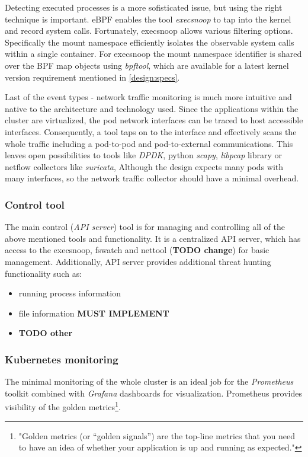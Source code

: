 Detecting executed processes is a more sofisticated issue, but using the right technique is important. eBPF enables the tool \textit{execsnoop} to tap into the kernel and record system calls. Fortunately, execsnoop allows various filtering options. Specifically the mount namespace efficiently isolates the observable system calls within a single container. For execsnoop the mount namespace identifier is shared over the BPF map objects using \textit{bpftool}, which are available for a latest kernel version requirement mentioned in \autoref{design:specs}.

Last of the event types - network traffic monitoring is much more intuitive and native to the architecture and technology used. Since the applications within the cluster are virtualized, the pod network interfaces can be traced to host accessible interfaces. Consequently, a tool taps on to the interface and effectively scans the whole traffic including a pod-to-pod and pod-to-external communications. This leaves open possibilities to tools like \textit{DPDK}, python \textit{scapy}, \textit{libpcap} library or netflow collectors like \textit{suricata}, Although the design expects many pods with many interfaces, so the network traffic collector should have a minimal overhead. %

\subsubsection*{Control tool \label{design:mon:tools:main}}
The main control (\textit{API server}) tool is for managing and controlling all of the above mentioned tools and functionality. It is a centralized API server, which has access to the execsnoop, fswatch and nettool (\textbf{TODO change}) for basic management. Additionally, API server provides additional threat hunting functionality such as:
\begin{itemize}
	\item running process information
	\item file information \textbf{MUST IMPLEMENT}
	\item \textbf{TODO other}
\end{itemize}

\subsubsection*{Kubernetes monitoring \label{design:mon:tools:k8s}}
The minimal monitoring of the whole cluster is an ideal job for the \textit{Prometheus} toolkit combined with \textit{Grafana} dashboards for visualization. Prometheus provides visibility of the golden metrics\footnote{"Golden metrics (or “golden signals”) are the top-line metrics that you need to have an idea of whether your application is up and running as expected."\cite{goldenmetrics}}.

